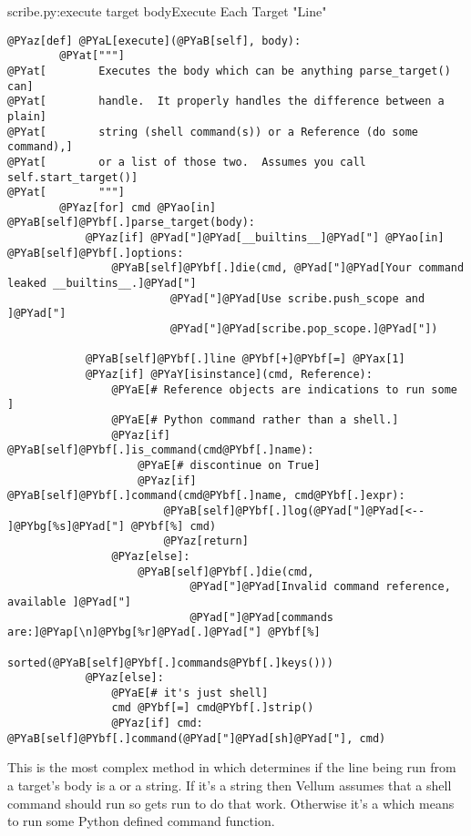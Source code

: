 \begin{code}{scribe.py:execute target body}{Execute Each Target "Line"}
\begin{Verbatim}[commandchars=@\[\]]
    @PYaz[def] @PYaL[execute](@PYaB[self], body):
        @PYat["""]
@PYat[        Executes the body which can be anything parse_target() can]
@PYat[        handle.  It properly handles the difference between a plain]
@PYat[        string (shell command(s)) or a Reference (do some command),]
@PYat[        or a list of those two.  Assumes you call self.start_target()]
@PYat[        """]
        @PYaz[for] cmd @PYao[in] @PYaB[self]@PYbf[.]parse_target(body):
            @PYaz[if] @PYad["]@PYad[__builtins__]@PYad["] @PYao[in] @PYaB[self]@PYbf[.]options:
                @PYaB[self]@PYbf[.]die(cmd, @PYad["]@PYad[Your command leaked __builtins__.]@PYad["]
                         @PYad["]@PYad[Use scribe.push_scope and ]@PYad["]
                         @PYad["]@PYad[scribe.pop_scope.]@PYad["])

            @PYaB[self]@PYbf[.]line @PYbf[+]@PYbf[=] @PYax[1]
            @PYaz[if] @PYaY[isinstance](cmd, Reference):
                @PYaE[# Reference objects are indications to run some ]
                @PYaE[# Python command rather than a shell.]
                @PYaz[if] @PYaB[self]@PYbf[.]is_command(cmd@PYbf[.]name):
                    @PYaE[# discontinue on True]
                    @PYaz[if] @PYaB[self]@PYbf[.]command(cmd@PYbf[.]name, cmd@PYbf[.]expr): 
                        @PYaB[self]@PYbf[.]log(@PYad["]@PYad[<-- ]@PYbg[%s]@PYad["] @PYbf[%] cmd)
                        @PYaz[return]
                @PYaz[else]:
                    @PYaB[self]@PYbf[.]die(cmd, 
                            @PYad["]@PYad[Invalid command reference, available ]@PYad["]
                            @PYad["]@PYad[commands are:]@PYap[\n]@PYbg[%r]@PYad[.]@PYad["] @PYbf[%] 
                            sorted(@PYaB[self]@PYbf[.]commands@PYbf[.]keys()))
            @PYaz[else]:
                @PYaE[# it's just shell]
                cmd @PYbf[=] cmd@PYbf[.]strip()
                @PYaz[if] cmd: @PYaB[self]@PYbf[.]command(@PYad["]@PYad[sh]@PYad["], cmd)
\end{Verbatim}

\end{code}

This is the most complex method in  which determines if the line
being run from a target's body is a  or a string.  If it's a
string then Vellum assumes that a shell command should run so
 gets run to do that work.  Otherwise it's a
 which means to run some Python defined command function.


